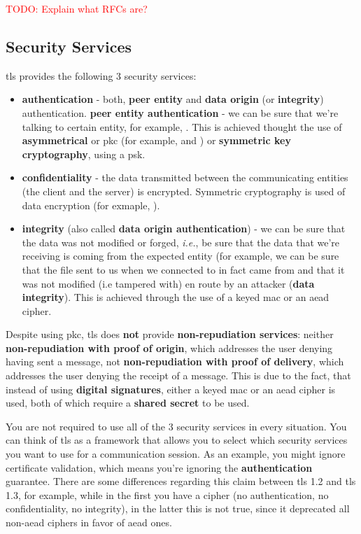 \documentclass{llncs}
\newcommand{\todo}[1]{\textcolor{red}{TODO: #1}\PackageWarning{TODO:}{#1!}}
\begin{document}
\todo{Explain what RFCs are?}
%
\subsection{Security Services}
%
\gls{tls} provides the following 3 security services:
\begin{itemize}
\item \textbf{authentication} - both, \textbf{peer entity} and \textbf{data origin} (or \textbf{integrity})
authentication.
\subitem \textbf{peer entity authentication} - we can be sure that we’re talking to certain entity, for example, .
This is achieved thought the use of \textbf{asymmetrical} or \gls{pkc} (for example,  and )
or \textbf{symmetric key cryptography}, using a \gls{psk}.
\item \textbf{confidentiality} - the data transmitted between the communicating
entities (the client and the server) is encrypted. Symmetric cryptography is
used of data encryption (for exmaple, ).
\item \textbf{integrity} (also called \textbf{data origin authentication}) - we can be sure that the data was not modified or forged,
\textit{i.e.}, be sure that the data that we’re receiving is coming from the expected entity (for example, we can be sure
that the  file sent to us when we connected to  in fact
came from  and that it was not modified (i.e tampered with) en
route by an attacker (\textbf{data integrity}). This is achieved through the use
of a keyed \gls{mac} or an \gls{aead} cipher.
\end{itemize}

Despite using \gls{pkc}, \gls{tls} does \textbf{not} provide \textbf{non-repudiation services}:
neither \textbf{non-repudiation with proof of origin}, which addresses the user denying
having sent a message, not \textbf{non-repudiation with proof of delivery}, which
addresses the user denying the receipt of a message. This is due to the fact, that
instead of using \textbf{digital signatures}, either a keyed \gls{mac} or an \gls{aead}
cipher is used, both of which require a \textbf{shared secret} to be used.

You are not required to use all of the 3 security services in every situation.
You can think of \gls{tls} as a framework that allows you to select which security
services you want to use for a communication session. As an example, you might
ignore certificate validation, which means you're ignoring the \textbf{authentication}
guarantee. There are some differences regarding this claim between \gls{tls} 1.2
and \gls{tls} 1.3, for example, while in the first you have a 
cipher (no authentication, no confidentiality, no integrity), in the latter
this is not true, since it deprecated all non-\gls{aead} ciphers in favor of
\gls{aead} ones.
\end{document}
